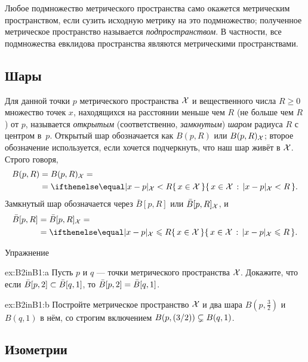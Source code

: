 {{Любое подмножество метрического пространства само окажется метрическим пространством, если сузить исходную метрику на это подмножество;
полученное метрическое пространство называется \emph{подпространством}.
В частности, все подмножества евклидова пространства являются метрическими пространствами.

}

\subsection*{Шары}

Для данной точки $p$ метрического пространства $\mathcal{X}$ и вещественного числа $R\ge 0$ множество точек $x$, находящихся на расстоянии меньше чем $R$ (не больше чем $R$) от $p$, называется \emph{открытым} (соответственно, \emph{замкнутым}) \emph{шаром} радиуса $R$ с центром в~$p$.
Открытый шар обозначается как $B(p,R)$ или $B(p,R)_{\mathcal{X}}$;
второе обозначение используется, если хочется подчеркнуть, что наш шар живёт в $\mathcal{X}$.
Строго говоря,
\begin{align*}
B(p,R)&=B(p,R)_{\spc{X}}=
\\
&=\set{x\in \spc{X}}{\dist{x}{p}{\spc{X}}< R}.
\end{align*}
Замкнутый шар обозначается через $\bar B[p,R]$ или $\bar B[p,R]_{\mathcal{X}}$, и
\begin{align*}
\bar B[p,R]&=\bar B[p,R]_{\spc{X}}=
\\
&=\set{x\in \spc{X}}{\dist{x}{p}{\spc{X}}\le R}.
\end{align*}

\begin{thm}{Упражнение}\label{ex:B2inB1}

\begin{subthm}{ex:B2inB1:a}
Пусть $p$ и $q$ --- точки метрического пространства $\mathcal{X}$.
Докажите, что если $\bar B[p,2]\z\subset \bar B[q,1]$, то $\bar B[p,2]\z=\bar B[q,1]$.
\end{subthm}

\begin{subthm}{ex:B2inB1:b}
Постройте метрическое пространство $\mathcal{X}$ и два шара $B(p,\tfrac32)$ и $B(q,1)$ в нём, со строгим включением
$B(p,\tfrac32)\z\subsetneq B(q,1)$.
\end{subthm}

\end{thm}

\subsection*{Изометрии}

}
